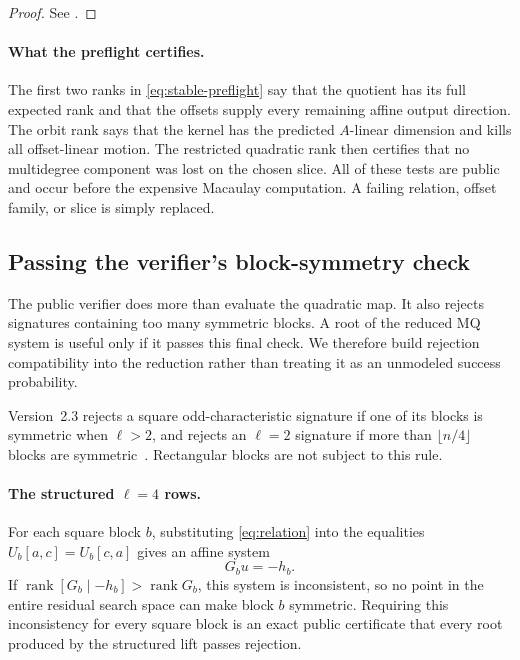 \documentclass[11pt]{article}
\newcommand{\rank}{\operatorname{rank}}
\begin{document}
\begin{proof}
See .
\end{proof}

\paragraph{What the preflight certifies.}
The first two ranks in \eqref{eq:stable-preflight} say that the quotient has
its full expected rank and that the offsets supply every remaining affine
output direction.  The orbit rank says that the kernel has the predicted
$A$-linear dimension and kills all offset-linear motion.  The restricted
quadratic rank then certifies that no multidegree component was lost on the
chosen slice.  All of these tests are public and occur before the expensive
Macaulay computation.  A failing relation, offset family, or slice is simply
replaced.

\subsection{Passing the verifier's block-symmetry check}\label{sec:rejection}

The public verifier does more than evaluate the quadratic map.  It also rejects
signatures containing too many symmetric blocks.  A root of the reduced MQ
system is useful only if it passes this final check.  We therefore build
rejection compatibility into the reduction rather than treating it as an
unmodeled success probability.

Version~2.3 rejects a square odd-characteristic signature if one of its blocks
is symmetric when $\ell>2$, and rejects an $\ell=2$ signature if more than
$\lfloor n/4\rfloor$ blocks are symmetric~\cite{SNOVA23}.  Rectangular blocks
are not subject to this rule.

\paragraph{The structured $\ell=4$ rows.}
For each square block $b$, substituting \eqref{eq:relation} into the equalities
$U_b[a,c]=U_b[c,a]$ gives an affine system
\begin{equation}\label{eq:rejection-affine}
 G_bu=-h_b.
\end{equation}
If $\rank[G_b\mid-h_b]>\rank G_b$, this system is inconsistent, so no point in
the entire residual search space can make block $b$ symmetric.  Requiring this
inconsistency for every square block is an exact public certificate that every
root produced by the structured lift passes rejection.
\end{document}
